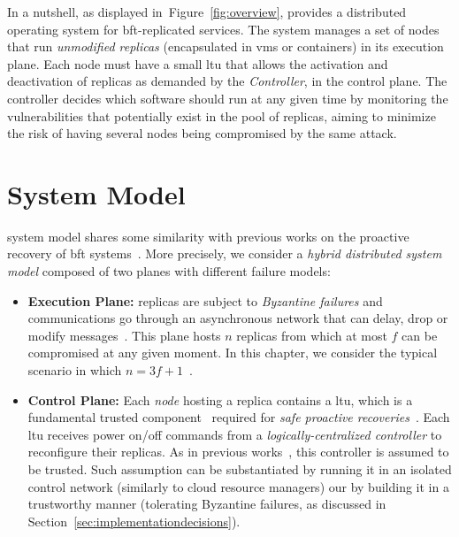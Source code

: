In a nutshell, as displayed in~Figure~\ref{fig:overview}, \system provides a distributed operating system for \gls{bft}-replicated services.
The system manages a set of nodes that run \emph{unmodified replicas} (encapsulated in \glspl{vm} or containers) in its execution plane. 
Each node must have a small \gls{ltu} that allows the activation and deactivation of replicas as demanded by the \system \emph{Controller}, in the control plane.
The controller decides which software should run at any given time by monitoring the vulnerabilities that potentially exist in the pool of replicas, aiming to minimize the risk of having several nodes being compromised by the same attack.



\section{System Model}
\label{sec:systemmodel}
\vspace{-4mm}

\system system model shares some similarity with previous works on the proactive recovery of \gls{bft} systems~\cite{Castro:2002,Platania:2014,Sousa:2010,Roeder:2010,Distler:2011}.
More precisely, we consider a \emph{hybrid distributed system model} composed of two planes with different failure models:

\begin{itemize}

\item \textbf{Execution Plane:} replicas are subject to \emph{Byzantine failures} and communications go through an asynchronous network that can delay, drop or modify messages~\cite{Castro:1999,Kotla:2010,Bessani:2014,Aublin:2015}.
This plane hosts $n$ replicas from which at most $f$ can be compromised at any given moment.
In this chapter, we consider the typical scenario in which $n=3f+1$~\cite{Castro:2002,Kotla:2010,Aublin:2015}.  
\vspace{-2mm}
\item \textbf{Control Plane:}  
Each \emph{node} hosting a replica contains a \gls{ltu}, which is a fundamental trusted component~\cite{Sousa:2007} required for \emph{safe proactive recoveries}~\cite{Castro:2002,Sousa:2010,Roeder:2010,Platania:2014,Distler:2011}.
Each \gls{ltu} receives power on/off commands from a \emph{logically-centralized controller} to reconfigure their replicas.
As in previous works~\cite{Roeder:2010,Platania:2014,Sousa:2010}, this controller is assumed to be trusted.
Such assumption can be substantiated by running it in an isolated control network (similarly to cloud resource managers) our by building it in a trustworthy manner (tolerating Byzantine failures, as discussed in Section~\ref{sec:implementationdecisions}).

\end{itemize}


